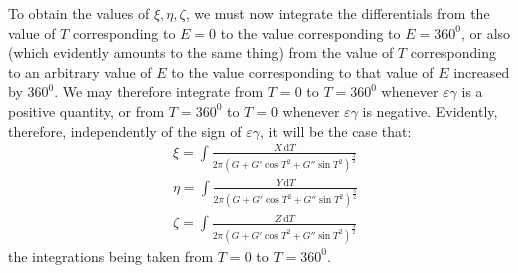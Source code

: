 To obtain the values of $\xi,\eta,\zeta$, we must now integrate the differentials from the value of $T$ corresponding to $E=0$ to the value corresponding to $E=360^0$, or also (which evidently amounts to the same thing) from the value of $T$ corresponding to an arbitrary value of $E$ to the value corresponding to that value of $E$ increased by $360^0$. We may therefore integrate from $T=0$ to $T=360^0$ whenever $\varepsilon\gamma$ is a positive quantity, or from $T=360^0$ to $T=0$ whenever $\varepsilon\gamma$ is negative. Evidently, therefore, independently of the sign of $\varepsilon\gamma$, it will be the case that:
\[
\begin{aligned}
&\xi=\int\frac{X\,\mathrm dT}{2\pi(G+G'\cos T^2+G''\sin T^2)^{\frac32}}\\[8pt]
&\eta=\int\frac{Y\,\mathrm dT}{2\pi(G+G'\cos T^2+G''\sin T^2)^{\frac32}}\\[8pt]
&\zeta=\int\frac{Z\,\mathrm dT}{2\pi(G+G'\cos T^2+G''\sin T^2)^{\frac32}}
\end{aligned}
\]
the integrations being taken from $T=0$ to $T=360^0$.

